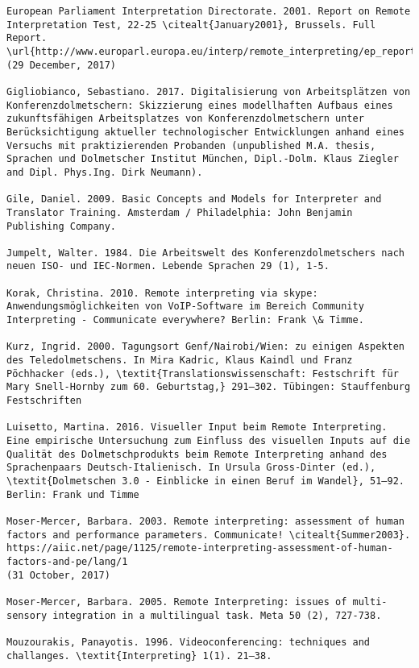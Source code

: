 \documentclass[output=paper]{langsci/langscibook}
\begin{document}
\begin{verbatim}
European Parliament Interpretation Directorate. 2001. Report on Remote Interpretation Test, 22-25 \citealt{January2001}, Brussels. Full Report. \url{http://www.europarl.europa.eu/interp/remote_interpreting/ep_report1.pdf} (29 December, 2017)

Gigliobianco, Sebastiano. 2017. Digitalisierung von Arbeitsplätzen von Konferenzdolmetschern: Skizzierung eines modellhaften Aufbaus eines zukunftsfähigen Arbeitsplatzes von Konferenzdolmetschern unter Berücksichtigung aktueller technologischer Entwicklungen anhand eines Versuchs mit praktizierenden Probanden (unpublished M.A. thesis, Sprachen und Dolmetscher Institut München, Dipl.-Dolm. Klaus Ziegler and Dipl. Phys.Ing. Dirk Neumann).

Gile, Daniel. 2009. Basic Concepts and Models for Interpreter and Translator Training. Amsterdam / Philadelphia: John Benjamin Publishing Company.

Jumpelt, Walter. 1984. Die Arbeitswelt des Konferenzdolmetschers nach neuen ISO- und IEC-Normen. Lebende Sprachen 29 (1), 1-5. 

Korak, Christina. 2010. Remote interpreting via skype: Anwendungsmöglichkeiten von VoIP-Software im Bereich Community Interpreting - Communicate everywhere? Berlin: Frank \& Timme.

Kurz, Ingrid. 2000. Tagungsort Genf/Nairobi/Wien: zu einigen Aspekten des Teledolmetschens. In Mira Kadric, Klaus Kaindl und Franz Pöchhacker (eds.), \textit{Translationswissenschaft: Festschrift für Mary Snell-Hornby zum 60. Geburtstag,} 291–302. Tübingen: Stauffenburg Festschriften

Luisetto, Martina. 2016. Visueller Input beim Remote Interpreting. Eine empirische Untersuchung zum Einfluss des visuellen Inputs auf die Qualität des Dolmetschprodukts beim Remote Interpreting anhand des Sprachenpaars Deutsch-Italienisch. In Ursula Gross-Dinter (ed.), \textit{Dolmetschen 3.0 - Einblicke in einen Beruf im Wandel}, 51–92. Berlin: Frank und Timme

Moser-Mercer, Barbara. 2003. Remote interpreting: assessment of human factors and performance parameters. Communicate! \citealt{Summer2003}. https://aiic.net/page/1125/remote-interpreting-assessment-of-human-factors-and-pe/lang/1
(31 October, 2017)

Moser-Mercer, Barbara. 2005. Remote Interpreting: issues of multi-sensory integration in a multilingual task. Meta 50 (2), 727-738.

Mouzourakis, Panayotis. 1996. Videoconferencing: techniques and challanges. \textit{Interpreting} 1(1). 21–38.


\end{verbatim}
\end{document}
